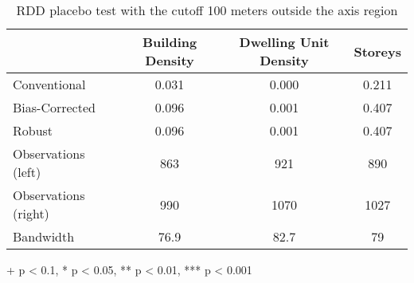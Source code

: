 \begin{table}[h]
  \centering
\caption{RDD placebo test with the cutoff 100 meters outside the axis region} 
\fontsize{10pt}{12pt}\selectfont
\begin{tabular*}{.85\linewidth}{@{\extracolsep{\fill}}lccc}
\toprule
  & Building Density & Dwelling Unit Density & Storeys \\ 
\midrule\addlinespace[2.5pt]
Conventional & 0.031 & 0.000 & 0.211 \\ 
Bias-Corrected & 0.096 & 0.001 & 0.407 \\ 
{Robust} & {0.096} & {0.001} & {0.407} \\ 
\midrule
Observations (left) & 863 & 921 & 890 \\ 
Observations (right) & 990 & 1070 & 1027 \\ 
Bandwidth & 76.9 & 82.7 & 79 \\ 
\bottomrule
\end{tabular*}
\begin{minipage}{.85\linewidth}
+ p < 0.1, * p < 0.05, ** p < 0.01, *** p < 0.001\\
\end{minipage}
\end{table}


